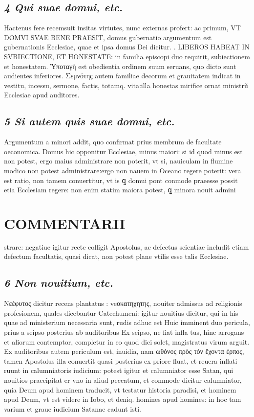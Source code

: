 \documentclass{article}
\begin{document}
\begin{pages}
\subsection*{\textit{4 Qui suae domui, etc. }}\pstart Hactenus fere recemsuit insitas virtutes, nunc externas profert: ac primum, VT DOMVI SVAE BENE PRAESIT, domus gubernatio argumentum est gubernationis Ecclesiae, quae et ipsa domus Dei dicitur.  \pend{}. LIBEROS HABEAT IN SVBIECTIONE, ET HONESTATE: in familia episcopi duo requirit, subiectionem et honestatem. Ὑποταγὴ est obedientia ordinem suum seruans, quo dicto sunt audientes inferiores. Σεμνότης autem familiae decorum et grauitatem indicat in vestitu, incessu, sermone, factis, totamq. vita:illa honestas mirifice ornat ministrũ Ecclesiae apud auditores.  \pend
{}
{}
\subsection*{\textit{5 Si autem quis suae domui, etc. }}\pstart Argumentum a minori addit, quo confirmat prius membrum de facultate oeconomica. Domus hic opponitur Ecclesiae, minus maiori: si id quod minus est non potest, ergo maius administrare non poterit, vt si, nauiculam in flumine modico non potest administrare:ergo non nauem in Oceano regere poterit: vera est ratio, non tamem conuertitur, vt is ꝗ domui pont conmode praeesse possit etia Ecclesiam regere: non enim statim maiora potest, ꝗ minora nouit admini  \pend
\section*{COMMENTARII }
\marginpar{[ p.68 ]}\pstart strare: negatiue igitur recte colligit Apostolus, ac defectus scientiae includit etiam defectum facultatis, quasi dicat, non potest plane vtilis esse talis Eeclesiae.  \pend
{}
{}
\subsection*{\textit{6 Non nouitium, etc. }}\pstart Νεέφυτος dicitur recens plantatus : veοκατηχητης, nouiter admissus ad religionis profesionem, quales dicebantur Catechumeni: igitur nouitius dicitur, qui in his quae ad ministerium necessaria sunt, rudis adhuc est Huic imminent duo pericula, prius a seipso posterius ab auditoribus  Ex seipso, ne fiat infla tus, hinc arrogans et aliorum contemptor, completur in eo quod dici solet, magistratus virum arguit. Ex auditoribus autem periculum est, inuidia, nam ωθόνος πρὸς τόν ἔχοντα έρπος, tamen Apostolus illa conuertit quasi posterius ex priore fluat, et reuera inflati ruunt in calumniatoris iudicium: potest igitur et calumniator esse Satan, qui nouitios praecipitat er vno in aliud peccatum, et commode dicitur calumniator, quia Deum apud hominem traducit, vt testatur historia paradisi, et hominem apud Deum, vt est videre in Iobo, et deniq. homines apud homines: in hoc tam varium et graue iudicium Satanae cadunt isti.  \pend
{}
{}

\end{pages}
\end{document}
